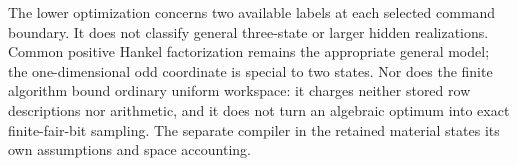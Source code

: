 The lower optimization concerns two available labels at each selected
command boundary. It does not classify general three-state or larger
hidden realizations. Common positive Hankel factorization remains the
appropriate general model; the one-dimensional odd coordinate is
special to two states. Nor does the finite algorithm bound ordinary
uniform workspace: it charges neither stored row descriptions nor
arithmetic, and it does not turn an algebraic optimum into exact
finite-fair-bit sampling. The separate compiler in the retained
material states its own assumptions and space accounting.
